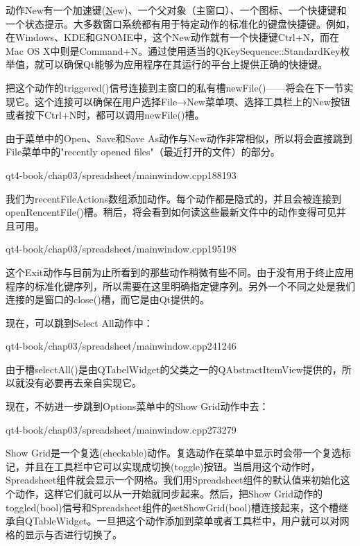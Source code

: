 \documentclass[11pt,oneside]{book}
\begin{document}
\begin{common-format}
动作New有一个加速键(\uline{N}ew)、一个父对象（主窗口）、一个图标、一个快捷键和一个状态提示。大多数窗口系统都有用于特定动作的标准化的键盘快捷键。例如，在Windows、KDE和GNOME中，这个New动作就有一个快捷键Ctrl+N，而在Mac OS X中则是Command+N。通过使用适当的QKeySequence::StandardKey枚举值，就可以确保Qt能够为应用程序在其运行的平台上提供正确的快捷键。

把这个动作的triggered()信号连接到主窗口的私有槽newFile()——将会在下一节实现它。这个连接可以确保在用户选择File→New菜单项、选择工具栏上的New按钮或者按下Ctrl+N时，都可以调用newFile()槽。

由于菜单中的Open、Save和Save As动作与New动作非常相似，所以将会直接跳到File菜单中的"recently opened files"（最近打开的文件）的部分。

\begin{cppline}{qt4-book/chap03/spreadsheet/mainwindow.cpp}{188}{193}
\end{cppline}

我们为recentFileActions数组添加动作。每个动作都是隐式的，并且会被连接到openRencentFile()槽。稍后，将会看到如何读这些最新文件中的动作变得可见并且可用。

\begin{cppline}{qt4-book/chap03/spreadsheet/mainwindow.cpp}{195}{198}
\end{cppline}

这个Exit动作与目前为止所看到的那些动作稍微有些不同。由于没有用于终止应用程序的标准化键序列，所以需要在这里明确指定键序列。另外一个不同之处是我们连接的是窗口的close()槽，而它是由Qt提供的。

现在，可以跳到Select All动作中：
\begin{cppline}{qt4-book/chap03/spreadsheet/mainwindow.cpp}{241}{246}
\end{cppline}

由于槽selectAll()是由QTabelWidget的父类之一的QAbstractItemView提供的，所以就没有必要再去亲自实现它。

现在，不妨进一步跳到Options菜单中的Show Grid动作中去：
\begin{cppline}{qt4-book/chap03/spreadsheet/mainwindow.cpp}{273}{279}
\end{cppline}

Show Grid是一个复选(checkable)动作。复选动作在菜单中显示时会带一个复选标记，并且在工具栏中它可以实现成切换(toggle)按钮。当启用这个动作时，Spreadsheet组件就会显示一个网格。我们用Spreadsheet组件的默认值来初始化这个动作，这样它们就可以从一开始就同步起来。然后，把Show Grid动作的toggled(bool)信号和Spreadsheet组件的setShowGrid(bool)槽连接起来，这个槽继承自QTableWidget。一旦把这个动作添加到菜单或者工具栏中，用户就可以对网格的显示与否进行切换了。


\end{common-format}
\end{document}

